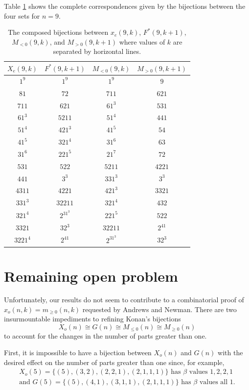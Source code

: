 \documentclass{amsart}
\theoremstyle{theorem}
\theoremstyle{definition}
\begin{document}
Table \ref{tab:all} shows the complete correspondences given by the bijections between the four sets for $n=9$.

\begin{table}[h]
\renewcommand{\arraystretch}{1.1}
\caption{The composed bijections between $x_e(9,k)$, $F^*(9,k+1)$, $M_{<0}(9,k)$, and $M_{>0}(9,k+1)$ where values of $k$ are separated by horizontal lines.} \label{tab:all}
\begin{tabular}{c|c|c|c}
$X_e(9,k)$ & $F^*(9,k+1)$ & $M_{<0}(9,k)$ & $M_{>0}(9,k+1)$ \\ \hline \hline
$1^9$ & $1^9$ & $1^9$ & $9$ \\ \hline
$81$ & $72$ & $711$ & $621$ \\
$711$ & $621$ & $61^3$ & $531$ \\
$61^3$ & $5211$ & $51^4$ & $441$ \\
$51^4$ & $421^3$ & $41^5$ & $54$ \\
$41^5$ & $321^4$ & $31^6$ &  $63$ \\
$31^6$ & $221^5$ & $21^7$ & $72$ \\ \hline
$531$ & $522$ & $5211$ & $4221$ \\
$441$ & $3^3$ & $331^3$ & $3^3$ \\
$4311$ & $4221$ & $421^3$ & $3321$ \\ 
$331^3$ & $32211$ & $321^4$ & $432$ \\
$321^4$ & $2^31^3$ & $221^5$ & $522$ \\ \hline
$3321$ & $32^3$ & $32211$ & $2^41$ \\
$3221^4$ & $2^41$ & $2^31^3$ & $32^3$
\end{tabular}
\end{table}


\section{Remaining open problem}
Unfortunately, our results do not seem to contribute to a combinatorial proof of $x_o(n,k) = m_{\ge 0}(n,k)$ requested by Andrews and Newman.  There are two insurmountable impediments to refining Konan's bijections 
\[X_o(n) \cong G(n) \cong M_{\le 0}(n) \cong M_{\ge 0}(n)\]
to account for the changes in the number of parts greater than one.

First, it is impossible to have a bijection between $X_o(n)$ and $G(n)$ with the desired effect on the number of parts greater than one since, for example, 
\begin{gather*}
X_o(5) = \{ (5), (3,2), (2,2,1), (2,1,1,1) \}  \text{ has $\beta$ values $1, 2, 2, 1$} \\
\text{and } G(5) = \{ (5), (4,1), (3,1,1), (2,1,1,1) \}  \text{ has $\beta$ values all $1$.}
\end{gather*}
\end{document}

